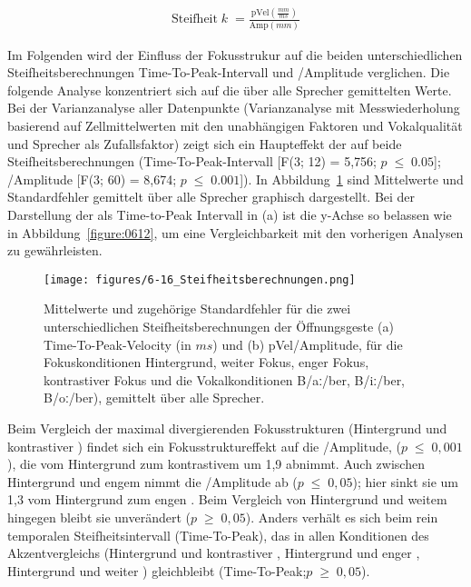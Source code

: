 \begin{align}
\label{eqn:06_26}
\text{Steifheit} \;k\; = \frac{\text{pVel}\left(\frac{mm}{ms}\right)}{\text{Amp}\left(mm\right)}
\end{align}

Im Folgenden wird der Einfluss der Fokusstrukur auf die beiden unterschiedlichen Steifheitsberechnungen Time-To-Peak-Intervall und /Amplitude verglichen. Die folgende Analyse konzentriert sich auf die über alle Sprecher gemittelten Werte. Bei der Varianzanalyse aller Datenpunkte (Varianzanalyse mit Messwiederholung basierend auf Zellmittelwerten mit den unabhängigen Faktoren  und Vokalqualität und Sprecher als Zufallsfaktor) zeigt sich ein Haupteffekt der  auf beide Steifheitsberechnungen (Time-To-Peak-Intervall [F(3; 12) = 5,756; $p\;\leq\;0.05$]; /Amplitude [F(3; 60) = 8,674; $p\;\leq\;0.001$]). In Abbildung~\ref{figure:0614} sind Mittelwerte und Standardfehler gemittelt über alle Sprecher graphisch dargestellt. Bei der Darstellung der  als Time-to-Peak Intervall in (a) ist die y-Achse so belassen wie in Abbildung~\ref{figure:0612}, um eine Vergleichbarkeit mit den vorherigen Analysen zu gewährleisten.



\begin{figure}
	\texttt{[image: figures/6-16\_Steifheitsberechnungen.png]}
	\caption{Mittelwerte und zugehörige Standardfehler für die zwei unterschiedlichen Steifheitsberechnungen der Öffnungsgeste (a) Time-To-Peak-Velocity (in $ms$) und (b) pVel/Amplitude, für die Fokuskonditionen Hintergrund, weiter Fokus, enger Fokus, kontrastiver Fokus und die Vokalkonditionen B/aː/ber, B/iː/ber, B/oː/ber), gemittelt über alle Sprecher.}
	\label{figure:0614}
\end{figure}


Beim Vergleich der maximal divergierenden Fokusstrukturen (Hintergrund und kontrastiver ) findet sich ein Fokusstruktureffekt auf die  /Amplitude, ($p\;\leq\;0,001$), die vom Hintergrund zum kontrastivem  um 1,9 abnimmt. Auch zwischen Hintergrund und engem  nimmt die  /Amplitude ab ($p\;\leq\;0,05$); hier sinkt sie um 1,3 vom Hintergrund zum engen . Beim Vergleich von Hintergrund und weitem  hingegen bleibt sie unverändert ($p\;\geq\;0,05$). Anders verhält es sich beim rein temporalen Steifheitsintervall (Time-To-Peak), das in allen Konditionen des Akzentvergleichs (Hintergrund und kontrastiver , Hintergrund und enger , Hintergrund und weiter ) gleichbleibt (Time-To-Peak;$p\;\geq\;0,05$).

